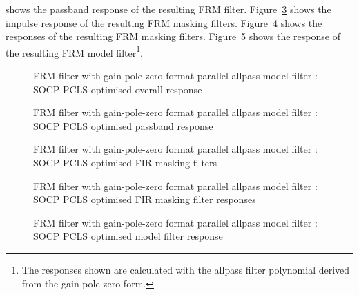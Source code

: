 \documentclass[a4paper,twoside,10pt,english]{report}
\begin{document}
shows the passband response of the resulting FRM filter. 
Figure~\ref{fig:iir-frm-parallel-allpass-socp-slb-pcls-masking-filters} 
shows the impulse response of the resulting FRM masking filters. 
Figure~\ref{fig:iir-frm-parallel-allpass-socp-slb-pcls-masking-response} 
shows the responses of the resulting FRM masking filters. 
Figure~\ref{fig:iir-frm-parallel-allpass-socp-slb-pcls-model-response} 
shows the response of the resulting FRM model filter\footnote{The responses
 shown are calculated with the allpass filter polynomial derived from the
gain-pole-zero form.}.
\begin{figure}[!htbp]
\begin{center}
\scalebox{0.7}{}
\caption{FRM filter with gain-pole-zero format parallel allpass model filter : SOCP PCLS optimised overall response}
\label{fig:iir-frm-parallel-allpass-socp-slb-pcls-overall-response}
\end{center}
\end{figure}
\begin{figure}[!htbp]
\begin{center}
\scalebox{0.7}{}
\caption{FRM filter with gain-pole-zero format parallel allpass model filter : SOCP PCLS optimised passband response}
\label{fig:iir-frm-parallel-allpass-socp-slb-pcls-passband-response}
\end{center}
\end{figure}
\begin{figure}[!htbp]
\begin{center}
\scalebox{0.7}{}
\caption{FRM filter with gain-pole-zero format parallel allpass model filter : SOCP PCLS optimised FIR masking filters}
\label{fig:iir-frm-parallel-allpass-socp-slb-pcls-masking-filters}
\end{center}
\end{figure}
\begin{figure}[!htbp]
\begin{center}
\scalebox{0.7}{}
\caption{FRM filter with gain-pole-zero format parallel allpass model filter : SOCP PCLS optimised FIR masking filter responses}
\label{fig:iir-frm-parallel-allpass-socp-slb-pcls-masking-response}
\end{center}
\end{figure}
\begin{figure}[!htbp]
\begin{center}
\scalebox{0.7}{}
\caption{FRM filter with gain-pole-zero format parallel allpass model filter : SOCP PCLS optimised model filter response}
\label{fig:iir-frm-parallel-allpass-socp-slb-pcls-model-response}
\end{center}
\end{figure}
\clearpage
\end{document}
